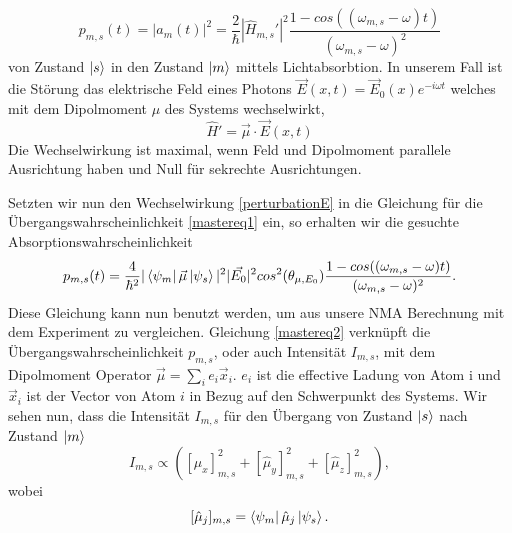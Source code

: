\documentclass[a4paper,12pt]{article}
\begin{document}
\begin{equation}\label{mastereq1}
 p_{m,s}(t)=|a_m(t)|^2 = \frac{2}{\hbar}|\hat{H}_{m,s}'|^2 \frac{1-cos((\omega_{m,s}-\omega) t)}{(\omega_{m,s}-\omega)^2}
\end{equation}
von Zustand $\ket{s}$ in den Zustand $\ket{m}$ mittels Lichtabsorbtion. 
In unserem Fall ist die Störung das elektrische Feld eines Photons $\vec{E}(x,t)=\vec{E}_0(x)e^{-i\omega t}$ welches mit dem Dipolmoment $\mu$ des Systems wechselwirkt,
\begin{equation}\label{perturbationE}
\hat{H}'=\vec{\mu}\cdot \vec{E}(x,t) 
\end{equation}
Die Wechselwirkung ist maximal, wenn Feld und Dipolmoment parallele Ausrichtung haben und Null für sekrechte Ausrichtungen. 

Setzten wir nun den Wechselwirkung \ref{perturbationE} in die Gleichung für die Übergangswahrscheinlichkeit \ref{mastereq1} ein, so erhalten wir die gesuchte Absorptionswahrscheinlichkeit
\begin{equation}\label{mastereq2}
 p_{m,s}(t)= \frac{4}{\hbar^2}|\bra{\psi_m} \vec{\mu} \ket{\psi_s} |^2 |\vec{E_0}|^2 cos^2(\theta_{\mu,E_0}) \frac{1-cos((\omega_{m,s}-\omega) t)}{(\omega_{m,s}-\omega)^2}.
\end{equation}
Diese Gleichung kann nun benutzt werden, um aus unsere NMA Berechnung mit dem Experiment zu vergleichen.
Gleichung \ref{mastereq2} verknüpft die Übergangswahrscheinlichkeit $p_{m,s}$, oder auch Intensität $I_{m,s}$, mit dem Dipolmoment Operator $\vec{\mu}=\sum_i e_i \vec{x}_i$. $e_i$ 
ist die effective Ladung von Atom i und $\vec{x}_i$ ist der Vector von Atom $i$ in Bezug auf den Schwerpunkt des Systems. 
Wir sehen nun, dass die Intensität $I_{m,s}$ für den Übergang von Zustand $\ket{s}$ nach Zustand $\ket{m}$ 
\begin{equation}\label{intensityeq1}
 I_{m,s} \varpropto \left( [\hat{\mu}_x]^2_{m,s} + [\hat{\mu}_y]^2_{m,s} + [\hat{\mu}_z]^2_{m,s} \right),
\end{equation}
wobei
\begin{equation}\label{dipl1}
[\hat{\mu}_j]_{m,s}=\bra{\psi_m}\hat{\mu}_j \ket{\psi_s}. 
\end{equation}
\end{document}
